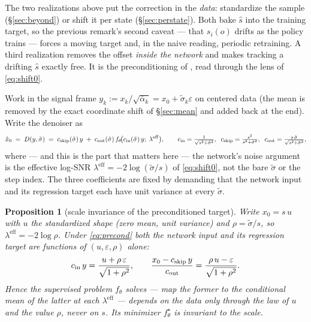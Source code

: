 \documentclass[11pt]{article}
\newtheorem{proposition}{Proposition}
\theoremstyle{definition}
\newcommand{\abar}{\bar\alpha}
\newcommand{\sig}{\tilde\sigma}
\newcommand{\leff}{\lambda^{\mathrm{eff}}}
\begin{document}
The two realizations above put the correction in the \emph{data}: standardize
the sample (\S\ref{sec:beyond}) or shift it per state (\S\ref{sec:perstate}).
Both bake $\hat s$ into the training target, so the previous remark's second
caveat --- that $s_i(o)$ drifts as the policy trains --- forces a moving target
and, in the naive reading, periodic retraining. A third realization removes the
offset \emph{inside the network} and makes tracking a drifting $\hat s$ exactly
free. It is the preconditioning of \cite{karras2022elucidating}, read through the
lens of \eqref{eq:shift0}.

Work in the signal frame $y_k:=x_k/\sqrt{\abar_k}=x_0+\sig_k\varepsilon$ on
centered data (the mean is removed by the exact coordinate shift of
\S\ref{sec:mean} and added back at the end). Write the denoiser as
\begin{equation}
  \hat x_0 \;=\; D(y,\sig)\;=\;c_{\rm skip}(\sig)\,y\;+\;c_{\rm out}(\sig)\,
  f_\theta\!\big(c_{\rm in}(\sig)\,y;\;\leff\big),
  \qquad
  c_{\rm in}=\tfrac{1}{\sqrt{s^2+\sig^2}},\;\;
  c_{\rm skip}=\tfrac{s^2}{s^2+\sig^2},\;\;
  c_{\rm out}=\tfrac{s\,\sig}{\sqrt{s^2+\sig^2}},
  \label{eq:precond}
\end{equation}
where --- and this is the part that matters here --- the network's noise argument
is the effective log-SNR $\leff=-2\log(\sig/s)$ of \eqref{eq:shift0}, not the bare
$\sig$ or the step index. The three coefficients are fixed by demanding that the
network input and its regression target each have unit variance at every $\sig$.

\begin{proposition}[scale invariance of the preconditioned target]
\label{prop:precond}
Write $x_0=s\,u$ with $u$ the standardized shape (zero mean, unit variance) and
$\rho=\sig/s$, so $\leff=-2\log\rho$. Under \eqref{eq:precond} both the network
input and its regression target are functions of $(u,\varepsilon,\rho)$ alone:
\begin{equation}
  c_{\rm in}\,y=\frac{u+\rho\,\varepsilon}{\sqrt{1+\rho^2}},
  \qquad
  \frac{x_0-c_{\rm skip}\,y}{c_{\rm out}}=\frac{\rho\,u-\varepsilon}{\sqrt{1+\rho^2}}.
  \label{eq:precond-inv}
\end{equation}
Hence the supervised problem $f_\theta$ solves --- map the former to the
conditional mean of the latter at each $\leff$ --- depends on the data only
through the law of $u$ and the value $\rho$, never on $s$. Its minimizer
$f_\theta^\star$ is invariant to the scale.
\end{proposition}
\end{document}
